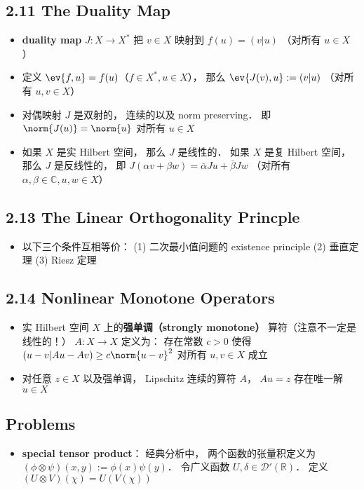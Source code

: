 \subsection{2.11 The Duality Map}
\begin{itemize}
\item \textbf{duality map} $J: X\to X^*$ 把 $v\in X$ 映射到 $f(u) = (v|u)$ （对所有 $u\in X$）

\item 定义 $\ev{f, u} = f(u)$（$f\in X^*, u\in X$）， 那么 $\ev{J(v), u} := (v|u)$ （对所有 $u, v\in X$）

\item 对偶映射 $J$ 是双射的， 连续的以及 norm preserving． 即 $\norm{J(u)} = \norm{u}$ 对所有 $u\in X$

\item 如果 $X$ 是实 Hilbert 空间， 那么 $J$ 是线性的． 如果 $X$ 是复 Hilbert 空间， 那么 $J$ 是反线性的， 即 $J(\alpha v + \beta w) = \bar \alpha Ju + \bar \beta Jw$ （对所有 $\alpha,\beta\in\mathbb C, u, w\in X$）
\end{itemize}

\subsection{2.13 The Linear Orthogonality Princple}
\begin{itemize}
\item 以下三个条件互相等价： (1) 二次最小值问题的 existence principle (2) 垂直定理 (3) Riesz 定理
\end{itemize}

\subsection{2.14 Nonlinear Monotone Operators}
\begin{itemize}
\item 实 Hilbert 空间 $X$ 上的\textbf{强单调（strongly monotone）} 算符（注意不一定是线性的！） $A:X\to X$ 定义为： 存在常数 $c > 0$ 使得 $(u-v|Au - Av) \ge c\norm{u-v}^2$ 对所有 $u, v\in X$ 成立

\item 对任意 $z \in X$ 以及强单调， Lipschitz 连续的算符 $A$， $Au = z$ 存在唯一解 $u\in X$
\end{itemize}

\subsection{Problems}
\begin{itemize}
\item \textbf{special tensor product}： 经典分析中， 两个函数的张量积定义为 $(\phi\otimes\psi)(x,y) := \phi(x)\psi(y)$． 令广义函数 $U, \delta \in \mathcal D'(\mathbb R)$． 定义 $(U\otimes V)(\chi) = U(V(\chi))$
\end{itemize}